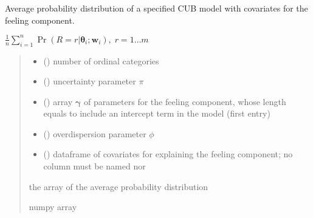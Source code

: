 \documentclass[letterpaper,10pt,english]{sphinxmanual}
\begin{document}
\begin{fulllineitems}
\label{\detokenize{cubmods:cubmods.cube_0w0.pmf}}
\pysigstartsignatures
{}
\pysigstopsignatures
\sphinxAtStartPar
Average probability distribution of a specified CUB model 
with covariates for the feeling component.

\sphinxAtStartPar
\(\frac{1}{n} \sum_{i=1}^n \Pr(R = r | \pmb\theta_i ; \pmb w_i),\; r=1 \ldots m\)
\begin{quote}\begin{description}
\begin{itemize}
\item {} 
\sphinxAtStartPar
{} () \textendash{} number of ordinal categories

\item {} 
\sphinxAtStartPar
{} () \textendash{} uncertainty parameter \(\pi\)

\item {} 
\sphinxAtStartPar
{} () \textendash{} array \(\pmb \gamma\) of parameters for the feeling component, whose length equals 
 to include an intercept term in the model (first entry)

\item {} 
\sphinxAtStartPar
{} () \textendash{} overdispersion parameter \(\phi\)

\item {} 
\sphinxAtStartPar
{} () \textendash{} dataframe of covariates for explaining the feeling component;
no column must be named  nor 

\end{itemize}

\sphinxAtStartPar
the array of the average probability distribution

\sphinxAtStartPar
numpy array

\end{description}\end{quote}

\end{fulllineitems}
\end{document}
